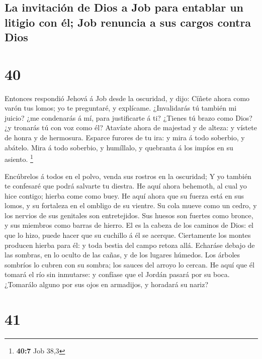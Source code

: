 \hypertarget{la-invitaciuxf3n-de-dios-a-job-para-entablar-un-litigio-con-uxe9l-job-renuncia-a-sus-cargos-contra-dios}{%
\subsection{La invitación de Dios a Job para entablar un litigio con él;
Job renuncia a sus cargos contra
Dios}\label{la-invitaciuxf3n-de-dios-a-job-para-entablar-un-litigio-con-uxe9l-job-renuncia-a-sus-cargos-contra-dios}}

\hypertarget{section-39}{%
\section{40}\label{section-39}}

 Entonces respondió Jehová á Job desde la oscuridad, y dijo:
 Cíñete ahora como varón tus lomos; yo te preguntaré, y
explícame.  ¿Invalidarás tú también mi juicio? ¿me
condenarás á mí, para justificarte á ti?  ¿Tienes tú brazo
como Dios? ¿y tronarás tú con voz como él?  Atavíate ahora
de majestad y de alteza: y vístete de honra y de hermosura. 
Esparce furores de tu ira: y mira á todo soberbio, y abátelo.
 Mira á todo soberbio, y humíllalo, y quebranta á los impíos
en su asiento. \footnote{\textbf{40:7} Job 38,3}

 Encúbrelos á todos en el polvo, venda sus rostros en la
oscuridad;  Y yo también te confesaré que podrá salvarte tu
diestra.  He aquí ahora behemoth, al cual yo hice contigo;
hierba come como buey.  He aquí ahora que su fuerza está en
sus lomos, y su fortaleza en el ombligo de su vientre.  Su
cola mueve como un cedro, y los nervios de sus genitales son
entretejidos.  Sus huesos son fuertes como bronce, y sus
miembros como barras de hierro.  El es la cabeza de los
caminos de Dios: el que lo hizo, puede hacer que su cuchillo á él se
acerque.  Ciertamente los montes producen hierba para él: y
toda bestia del campo retoza allá.  Echaráse debajo de las
sombras, en lo oculto de las cañas, y de los lugares húmedos.
 Los árboles sombríos lo cubren con su sombra; los sauces
del arroyo lo cercan.  He aquí que él tomará el río sin
inmutarse: y confíase que el Jordán pasará por su boca. 
¿Tomarálo alguno por sus ojos en armadijos, y horadará su nariz?

\hypertarget{section-40}{%
\section{41}\label{section-40}}

